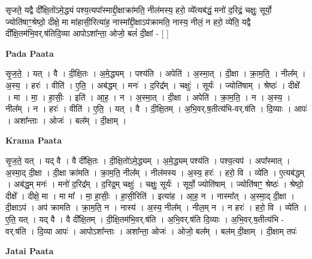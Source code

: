 \documentclass[17pt]{extarticle}
\begin{document}
सृजते॒ यद्वै दी᳚क्षि॒तो॑ऽमे॒द्ध्यं पश्य॒त्यपा᳚स्माद्दी॒क्षाक्रा॑मति॒ नील॑मस्य॒ हरो॒ व्ये᳚त्यब॑द्धं॒ मनो॑ द॒रिद्रं॒ चक्षुः॒ सूर्यो॒ ज्योति॑षाꣳ॒॒श्रेष्ठो॒ दीक्षे॒ मा मा॑हासी॒रित्या॑ह॒ नास्मा᳚द्दी॒क्षाऽप॑क्रामति॒ नास्य॒ नीलं॒ न हरो॒ व्ये॑ति॒ यद्वै दी᳚क्षि॒तम॑भि॒वर्.ष॑तिदि॒व्या आपोऽशा᳚न्ता॒ ओजो॒ बलं॑ दी॒क्षां - [  ] \newline

\textbf{Pada Paata} \newline

सृ॒ज॒ते॒ । यत् । वै । दी॒क्षि॒तः । अ॒मे॒द्ध्यम् । पश्य॑ति । अपेति॑ । अ॒स्मा॒त् । दी॒क्षा । क्रा॒म॒ति॒ । नील᳚म् । अ॒स्य॒ । हरः॑ । वीति॑ । ए॒ति॒ । अब॑द्धम् । मनः॑ । द॒रिद्र᳚म् । चक्षुः॑ । सूर्यः॑ । ज्योति॑षाम् । श्रेष्ठः॑ । दीक्षे᳚ । मा । मा॒ । हा॒सीः॒ । इति॑ । आ॒ह॒ । न । अ॒स्मा॒त् । दी॒क्षा । अपेति॑ । क्रा॒म॒ति॒ । न । अ॒स्य॒ । नील᳚म् । न । हरः॑ । वीति॑ । ए॒ति॒ । यत् । वै । दी॒क्षि॒तम् । अ॒भि॒वर्.ष॒तीत्य॑भि-वर्.ष॑ति । दि॒व्याः । आपः॑ । अशा᳚न्ताः । ओजः॑ । बल᳚म् । दी॒क्षाम् ।  \newline


\textbf{Krama Paata} \newline

सृ॒ज॒ते॒ यत् । यद् वै । वै दी᳚क्षि॒तः । दी॒क्षि॒तो॑ऽमे॒द्ध्यम् । अ॒मे॒द्ध्यम् पश्य॑ति । पश्य॒त्यप॑ । अपा᳚स्मात् । अ॒स्मा॒द् दी॒क्षा । दी॒क्षा क्रा॑मति । क्रा॒म॒ति॒ नील᳚म् । नील॑मस्य । अ॒स्य॒ हरः॑ । हरो॒ वि । व्ये॑ति । ए॒त्यब॑द्धम् । अब॑द्ध॒म् मनः॑ । मनो॑ द॒रिद्र᳚म् । द॒रिद्र॒म् चक्षुः॑ । चक्षुः॒ सूर्यः॑ । सूर्यो॒ ज्योति॑षाम् । ज्योति॑षाꣳ॒॒ श्रेष्ठः॑ । श्रेष्ठो॒ दीक्षे᳚ । दीक्षे॒ मा । मा मा᳚ । मा॒ हा॒सीः॒ । हा॒सी॒रिति॑ । इत्या॑ह । आ॒ह॒ न । नास्मा᳚त् । अ॒स्मा॒द् दी॒क्षा । दी॒क्षाऽप॑ । अप॑ क्रामति । क्रा॒म॒ति॒ न । नास्य॑ । अ॒स्य॒ नील᳚म् । नील॒म् न । न हरः॑ । हरो॒ वि । व्ये॑ति । ए॒ति॒ यत् । यद् वै । वै दी᳚क्षि॒तम् । दी॒क्षि॒तम॑भि॒वर्.ष॑ति । अ॒भि॒वर्.ष॑ति दि॒व्याः । अ॒भि॒वर्.ष॒तीत्य॑भि - वर्.ष॑ति । दि॒व्या आपः॑ । आपोऽशा᳚न्ताः । अशा᳚न्ता॒ ओजः॑ । ओजो॒ बल᳚म् । बल॑म् दी॒क्षाम् । दी॒क्षाम् तपः॑ \newline

\textbf{Jatai Paata} \newline
\end{document}
